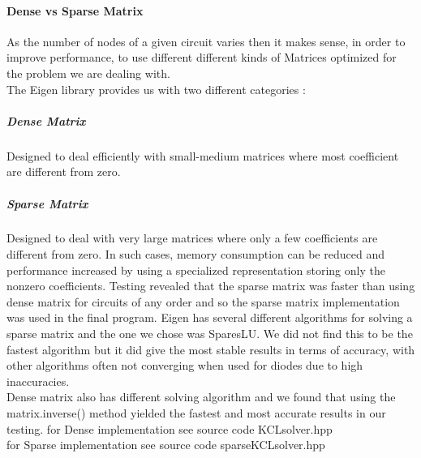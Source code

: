 \documentclass{article}
\begin{document}
\paragraph{Dense vs Sparse Matrix}
As the number of nodes of a given circuit varies then it makes sense, in order to improve performance, to use different different kinds of Matrices optimized for the problem we are dealing with. \\
The Eigen library provides us with two different categories :
\subparagraph{Dense Matrix} Designed to deal efficiently with small-medium matrices where most coefficient are different from zero.
\subparagraph{Sparse Matrix} Designed to deal with very large matrices where only a few coefficients are different from zero. In such cases, memory consumption can be reduced and performance increased by using a specialized representation storing only the nonzero coefficients.\bigbreak
Testing revealed that the sparse matrix was faster than using dense matrix for circuits of any order and so the sparse matrix implementation was used in the final program. Eigen has several different algorithms for solving a sparse matrix and the one we chose was SparesLU. We did not find this to be the fastest algorithm but it did give the most stable results in terms of accuracy, with other algorithms often not converging when used for diodes due to high inaccuracies. \\
Dense matrix also has different solving algorithm and we found that using the matrix.inverse() method yielded the fastest and most accurate results in our testing. 
\bigbreak
for Dense implementation see source code KCLsolver.hpp\\
for Sparse implementation see source code sparseKCLsolver.hpp
\newpage
\end{document}
